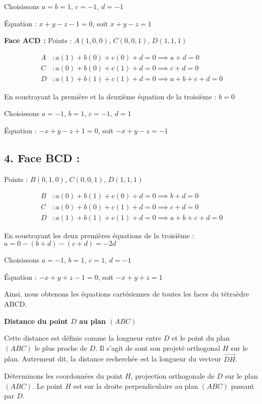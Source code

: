 \documentclass[10pt,a4paper]{article}
\begin{document}
Choisissons $a = b = 1$, $c = -1$, $d = -1$

Équation : $x + y - z - 1 = 0$, soit $x + y - z = 1$

\textbf{Face ACD :}
Points : $A(1,0,0)$, $C(0,0,1)$, $D(1,1,1)$

\begin{align*}
A &: a(1) + b(0) + c(0) + d = 0 \implies a + d = 0 \\
C &: a(0) + b(0) + c(1) + d = 0 \implies c + d = 0 \\
D &: a(1) + b(1) + c(1) + d = 0 \implies a + b + c + d = 0
\end{align*}

En soustrayant la première et la deuxième équation de la troisième :
$b = 0$

Choisissons $a = -1$, $b = 1$, $c = -1$, $d = 1$

Équation : $-x + y - z + 1 = 0$, soit $-x + y - z = -1$

\subsection*{4. Face BCD :}
Points : $B(0,1,0)$, $C(0,0,1)$, $D(1,1,1)$

\begin{align*}
B &: a(0) + b(1) + c(0) + d = 0 \implies b + d = 0 \\
C &: a(0) + b(0) + c(1) + d = 0 \implies c + d = 0 \\
D &: a(1) + b(1) + c(1) + d = 0 \implies a + b + c + d = 0
\end{align*}

En soustrayant les deux premières équations de la troisième :
$a = 0 - (b + d) - (c + d) = -2d$

Choisissons $a = -1$, $b = 1$, $c = 1$, $d = -1$

Équation : $-x + y + z - 1 = 0$, soit $-x + y + z = 1$

Ainsi, nous obtenons les équations cartésiennes de toutes les faces du tétraèdre ABCD.


\q \textbf{Distance du point \(D\) au plan \((ABC)\)}

Cette distance est définie comme la longueur entre \( D \) et le point du plan \( (ABC) \) le plus
proche de \( D \). Il s'agit de sont son projeté orthogonal \( H \) sur le plan. Autrement dit, la
distance recherchée est la longueur du vecteur \( \overrightarrow{DH} \).

Déterminons les coordonnées du point $H$, projection orthogonale de $D$ sur le plan $(ABC)$.
Le point $H$ est sur la droite perpendiculaire au plan $(ABC)$ passant par $D$.
\end{document}
